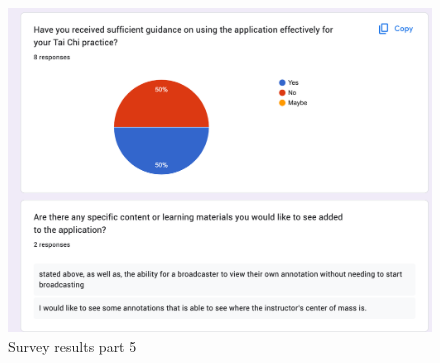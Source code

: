 \documentclass[12pt, titlepage]{article}
\begin{document}
\begin{figure}[h]
  \centering
  \includegraphics[width=1.0\linewidth]{surveyp5.png}
  \caption{Survey results part 5}
  \label{fig:surveyp5}
\end{figure}
\end{document}
